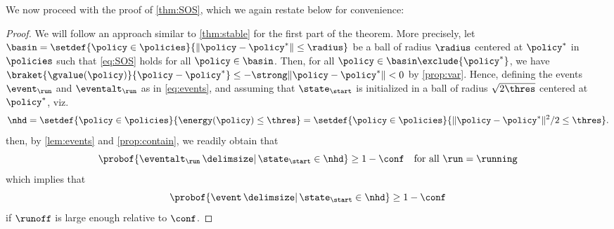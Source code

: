 

We now proceed with the proof of \cref{thm:SOS}, which we again restate below for convenience:

\SOS*

\begin{proof}
We will follow an approach similar to \cref{thm:stable} for the first part of the theorem.
More precisely, let $\basin = \setdef{\policy\in\policies}{\norm{\policy - \eq} \leq \radius}$ be a ball of radius $\radius$ centered at $\eq$ in $\policies$ such that \eqref{eq:SOS} holds for all $\policy\in\basin$.
Then, for all $\policy\in\basin\exclude{\eq}$, we have $\braket{\gvalue(\policy)}{\policy - \eq} \leq - \strong \norm{\policy - \eq} < 0$ by \cref{prop:var}.
Hence, defining the events $\curr[\event]$ and $\curr[\eventalt]$ as in \cref{eq:events}, and assuming that $\init$ is initialized in a ball of radius $\sqrt{2\thres}$ centered at $\eq$, viz.
\begin{equation}
\label{eq:nhd-init-1}
\nhd
	= \setdef{\policy\in\policies}{\energy(\policy) \leq \thres}
	= \setdef{\policy\in\policies}{\norm{\policy-\eq}^{2}/2 \leq \thres}.
\end{equation}
then, by \cref{lem:events} and \cref{prop:contain}, we readily obtain that
\begin{equation}
\label{eq:contain}
\probof{\curr[\eventalt] \given \init\in\nhd}
	\geq 1-\conf
	\quad
	\text{for all $\run=\running$}
\end{equation}
which implies that 
\begin{equation}
	\probof{\event \given \init\in\nhd} \geq 1-\conf
\end{equation}
if $\runoff$ is large enough relative to $\conf$.


\end{proof}
